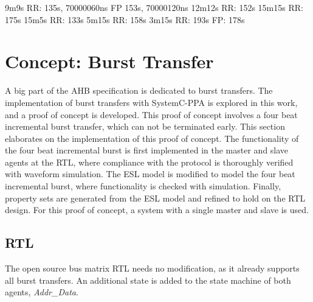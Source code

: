 9m9s RR: 135s, 70000060ns FP 153s, 70000120ns
12m12s RR: 152s
15m15s RR: 175s
15m5s  RR: 133s
5m15s  RR: 158s
3m15s  RR: 193s    FP: 178s





\section{Concept: Burst Transfer}
\label{sec:burst}
A big part of the AHB specification is dedicated to burst transfers. The implementation of burst transfers with SystemC-PPA is explored in this work, and a proof of concept is developed. 
This proof of concept involves a four beat incremental burst transfer, which can not be terminated early. This section elaborates on the implementation of this proof of concept. The functionality
of the four beat incremental burst is first implemented in the master and slave agents at the RTL, where compliance with the protocol is thoroughly verified with waveform simulation. The ESL model is
modified to model the four beat incremental burst, where functionality is checked with simulation. Finally, property sets are generated from the ESL model and refined to hold on the RTL design. For this proof of concept, a system with a single master and slave is used. 

\subsection{RTL}
The open source bus matrix RTL needs no modification, as it already supports all burst transfers. An additional state is added to the state machine of both agents, \textit{Addr\_Data}. 

